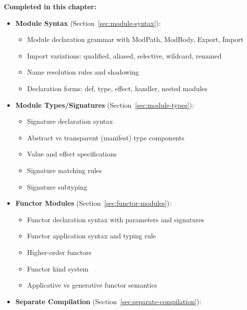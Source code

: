 \begin{tcolorbox}[colback=green!5!white,colframe=green!50!black,title=\textbf{Handoff: COMPILER-TASK-06 Complete},breakable]
\textbf{Completed in this chapter:}
\begin{itemize}
  \item \textbf{Module Syntax} (Section~\ref{sec:module-syntax}):
    \begin{itemize}
      \item Module declaration grammar with ModPath, ModBody, Export, Import
      \item Import variations: qualified, aliased, selective, wildcard, renamed
      \item Name resolution rules and shadowing
      \item Declaration forms: def, type, effect, handler, nested modules
    \end{itemize}
  \item \textbf{Module Types/Signatures} (Section~\ref{sec:module-types}):
    \begin{itemize}
      \item Signature declaration syntax
      \item Abstract vs transparent (manifest) type components
      \item Value and effect specifications
      \item Signature matching rules
      \item Signature subtyping
    \end{itemize}
  \item \textbf{Functor Modules} (Section~\ref{sec:functor-modules}):
    \begin{itemize}
      \item Functor declaration syntax with parameters and signatures
      \item Functor application syntax and typing rule
      \item Higher-order functors
      \item Functor kind system
      \item Applicative vs generative functor semantics
    \end{itemize}
  \item \textbf{Separate Compilation} (Section~\ref{sec:separate-compilation}):
    \begin{itemize}

\end{itemize}
\end{itemize}
\end{tcolorbox}

